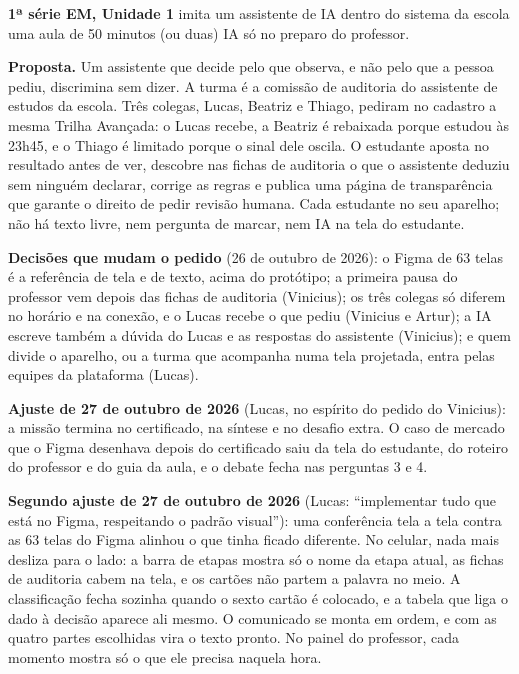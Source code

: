 
\textbf{1ª série EM, Unidade 1} \textperiodcentered{} imita um assistente de
IA dentro do sistema da escola \textperiodcentered{} uma aula de 50 minutos
(ou duas) \textperiodcentered{} IA só no preparo do professor.

\textbf{Proposta.} Um assistente que decide pelo que observa, e não pelo que a
pessoa pediu, discrimina sem dizer. A turma é a comissão de auditoria do
assistente de estudos da escola. Três colegas, Lucas, Beatriz e Thiago,
pediram no cadastro a mesma Trilha Avançada: o Lucas recebe, a Beatriz é
rebaixada porque estudou às 23h45, e o Thiago é limitado porque o sinal dele
oscila. O estudante aposta no resultado antes de ver, descobre nas fichas de
auditoria o que o assistente deduziu sem ninguém declarar, corrige as regras
e publica uma página de transparência que garante o direito de pedir revisão
humana. Cada estudante no seu aparelho; não há texto livre, nem pergunta de
marcar, nem IA na tela do estudante.

\textbf{Decisões que mudam o pedido} (26 de outubro de 2026): o Figma de 63
telas é a referência de tela e de texto, acima do protótipo; a primeira pausa
do professor vem depois das fichas de auditoria (Vinicius); os três colegas só
diferem no horário e na conexão, e o Lucas recebe o que pediu (Vinicius e
Artur); a IA escreve também a dúvida do Lucas e as respostas do assistente
(Vinicius); e quem divide o aparelho, ou a turma que acompanha numa tela
projetada, entra pelas equipes da plataforma (Lucas).

\textbf{Ajuste de 27 de outubro de 2026} (Lucas, no espírito do pedido do
Vinicius): a missão termina no certificado, na síntese e no desafio extra. O
caso de mercado que o Figma desenhava depois do certificado saiu da tela do
estudante, do roteiro do professor e do guia da aula, e o debate fecha nas
perguntas 3 e 4.

\textbf{Segundo ajuste de 27 de outubro de 2026} (Lucas: \enquote{implementar
tudo que está no Figma, respeitando o padrão visual}): uma conferência tela a
tela contra as 63 telas do Figma alinhou o que tinha ficado diferente. No
celular, nada mais desliza para o lado: a barra de etapas mostra só o nome da
etapa atual, as fichas de auditoria cabem na tela, e os cartões não partem a
palavra no meio. A classificação fecha sozinha quando o sexto cartão é
colocado, e a tabela que liga o dado à decisão aparece ali mesmo. O
comunicado se monta em ordem, e com as quatro partes escolhidas vira o texto
pronto. No painel do professor, cada momento mostra só o que ele precisa
naquela hora.

